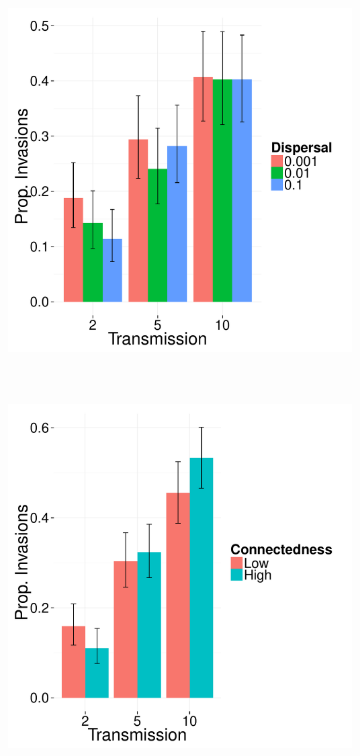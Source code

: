 \begin{figure}[b]
\centering
        \begin{subfigure}[b]{0.35\textwidth}
                \centering
		\includegraphics[width=1\textwidth]{imgs/fig150327.pdf}
                \caption{}
                \label{fig:dispersalProbs}
        \end{subfigure}
        ~ 
	\begin{subfigure}[b]{0.35\textwidth}
                \centering
		\includegraphics[width=1\textwidth]{imgs/figs.pdf}
                \caption{}
                \label{fig:structureProbs}
        \end{subfigure}%


\end{figure}
